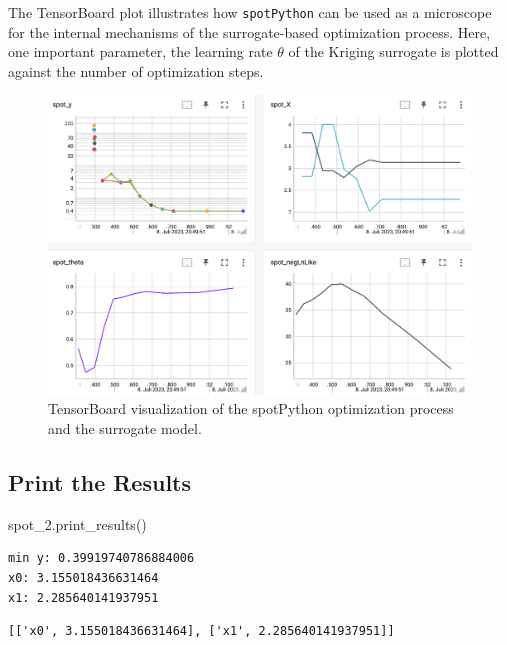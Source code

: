 \documentclass[
  letterpaper,
  DIV=11,
  numbers=noendperiod]{scrreprt}
\newenvironment{Shaded}{\begin{snugshade}}{\end{snugshade}}
\newcommand{\NormalTok}[1]{\textcolor[rgb]{0.00,0.23,0.31}{#1}}
\begin{document}
The TensorBoard plot illustrates how \texttt{spotPython} can be used as
a microscope for the internal mechanisms of the surrogate-based
optimization process. Here, one important parameter, the learning rate
\(\theta\) of the Kriging surrogate is plotted against the number of
optimization steps.

\begin{figure}[H]

{\centering \includegraphics[width=1\textwidth,height=\textheight]{figures_static/04_tensorboard_01.png}

}

\caption{TensorBoard visualization of the spotPython optimization
process and the surrogate model.}

\end{figure}%

\subsection{Print the Results}\label{print-the-results-2}

\begin{Shaded}
\begin{Highlighting}[]
\NormalTok{spot\_2.print\_results()}
\end{Highlighting}
\end{Shaded}

\begin{verbatim}
min y: 0.39919740786884006
x0: 3.155018436631464
x1: 2.285640141937951
\end{verbatim}

\begin{verbatim}
[['x0', 3.155018436631464], ['x1', 2.285640141937951]]
\end{verbatim}
\end{document}
